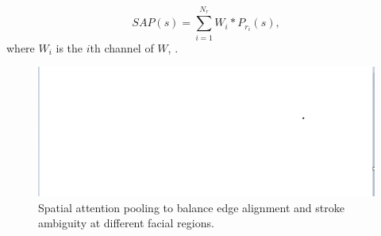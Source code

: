 \begin{equation}
	SAP(s)=\sum_{i=1}^{N_r} W_i * P_{r_i}(s),
\end{equation}
%
where $W_i$ is the $i$th channel of $W$, .

\begin{figure}
	\centering
	\includegraphics[width=\columnwidth]{figs/box.png}
	\caption{Spatial attention pooling to balance edge alignment and stroke ambiguity at different facial regions. }
	\label{fig:sap}
\end{figure}


